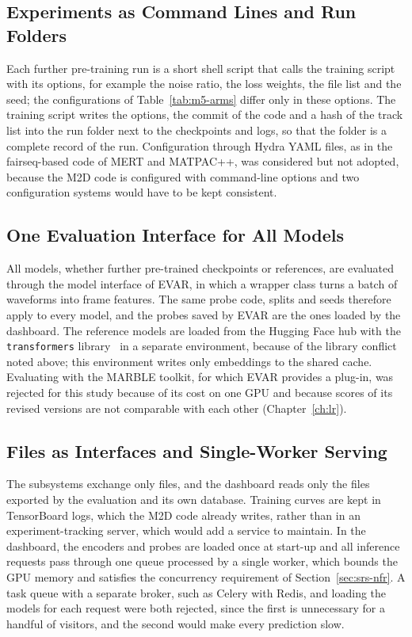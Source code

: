 \documentclass{FastFyp}
\begin{document}
\subsection{Experiments as Command Lines and Run Folders}
Each further pre-training run is a short shell script that calls the training script with its options, for example the noise ratio, the loss weights, the file list and the seed; the configurations of Table~\ref{tab:m5-arms} differ only in these options. The training script writes the options, the commit of the code and a hash of the track list into the run folder next to the checkpoints and logs, so that the folder is a complete record of the run. Configuration through Hydra YAML files, as in the fairseq-based code of MERT and MATPAC++, was considered but not adopted, because the M2D code is configured with command-line options and two configuration systems would have to be kept consistent.

\subsection{One Evaluation Interface for All Models}
All models, whether further pre-trained checkpoints or references, are evaluated through the model interface of EVAR, in which a wrapper class turns a batch of waveforms into frame features. The same probe code, splits and seeds therefore apply to every model, and the probes saved by EVAR are the ones loaded by the dashboard. The reference models are loaded from the Hugging Face hub with the \texttt{transformers} library~\cite{ref:Wolf:2020transformers} in a separate environment, because of the library conflict noted above; this environment writes only embeddings to the shared cache. Evaluating with the MARBLE toolkit, for which EVAR provides a plug-in, was rejected for this study because of its cost on one GPU and because scores of its revised versions are not comparable with each other (Chapter~\ref{ch:lr}).

\subsection{Files as Interfaces and Single-Worker Serving}
The subsystems exchange only files, and the dashboard reads only the files exported by the evaluation and its own database. Training curves are kept in TensorBoard logs, which the M2D code already writes, rather than in an experiment-tracking server, which would add a service to maintain. In the dashboard, the encoders and probes are loaded once at start-up and all inference requests pass through one queue processed by a single worker, which bounds the GPU memory and satisfies the concurrency requirement of Section~\ref{sec:srs-nfr}. A task queue with a separate broker, such as Celery with Redis, and loading the models for each request were both rejected, since the first is unnecessary for a handful of visitors, and the second would make every prediction slow.
\end{document}
